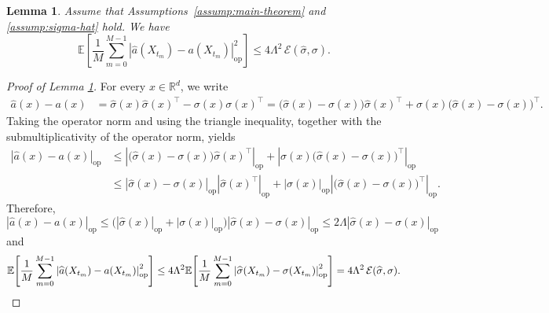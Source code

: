 \documentclass{article}
\theoremstyle{plain}
\newtheorem{lemma}[theorem]{Lemma}
\theoremstyle{definition}
\theoremstyle{remark}
\newcommand{\RD}{\mathbb{R}^{d}}
\newcommand{\EE}{\mathbb{E}}
\begin{document}
\begin{lemma}\label{lem:a-hat-sigma-hat-bound}
Assume that Assumptions~\ref{assump:main-theorem} and \ref{assump:sigma-hat} hold. We have
\[
\EE\!\left[
\frac{1}{M}\sum_{m=0}^{M-1}
\left|\widehat a(X_{t_m})-a(X_{t_m})\right|_{\mathrm{op}}^2
\right]
\le 4\Lambda^2\,\mathcal E(\widehat \sigma,\sigma).
\]
\end{lemma}

\begin{proof}[Proof of Lemma \ref{lem:a-hat-sigma-hat-bound}]
For every \(x\in\RD\), we write
\begin{align*}
\widehat a(x)-a(x)
&=
\widehat \sigma(x)\widehat \sigma(x)^{\top}
-\sigma(x)\sigma(x)^{\top}=
\bigl(\widehat \sigma(x)-\sigma(x)\bigr)\widehat \sigma(x)^{\top}
+\sigma(x)\bigl(\widehat \sigma(x)-\sigma(x)\bigr)^{\top}.
\end{align*}
Taking the operator norm and using the triangle inequality, together with the submultiplicativity of the operator norm, yields
\begin{align*}
\left|\widehat a(x)-a(x)\right|_{\mathrm{op}}
&\le
\left|\bigl(\widehat \sigma(x)-\sigma(x)\bigr)\widehat \sigma(x)^{\top}\right|_{\mathrm{op}}
+
\left|\sigma(x)\bigl(\widehat \sigma(x)-\sigma(x)\bigr)^{\top}\right|_{\mathrm{op}}\\
&\le
\left|\widehat \sigma(x)-\sigma(x)\right|_{\mathrm{op}}
\left|\widehat \sigma(x)^{\top}\right|_{\mathrm{op}}
+
\left|\sigma(x)\right|_{\mathrm{op}}
\left|\bigl(\widehat \sigma(x)-\sigma(x)\bigr)^{\top}\right|_{\mathrm{op}}.
\end{align*}
Therefore,
\[
\left|\widehat a(x)-a(x)\right|_{\mathrm{op}}
\le
\bigl(
|\widehat \sigma(x)|_{\mathrm{op}}+|\sigma(x)|_{\mathrm{op}}
\bigr)
\left|\widehat \sigma(x)-\sigma(x)\right|_{\mathrm{op}}\le 2\Lambda \left|\widehat \sigma(x)-\sigma(x)\right|_{\mathrm{op}}
\]
and
\[
\EE\!\left[
\frac{1}{M}\sum_{m=0}^{M-1}
\left|\widehat a(X_{t_m})-a(X_{t_m})\right|_{\mathrm{op}}^2
\right]
\le
4\Lambda^2
\EE\!\left[
\frac{1}{M}\sum_{m=0}^{M-1}
\left|\widehat \sigma(X_{t_m})-\sigma(X_{t_m})\right|_{\mathrm{op}}^2
\right]= 4\Lambda^2\,\mathcal E(\widehat \sigma,\sigma). \hfill\qedhere
\]
\end{proof}
\end{document}
